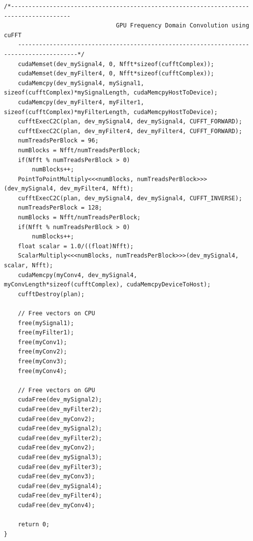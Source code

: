 \begin{lstlisting}[caption={CUDA code to performing complex convolution four different ways: time domain CPU, time domain GPU, time domain GPU using shared memory and frequency domain GPU.},label={code:convFun}]
	/*---------------------------------------------------------------------------------------
                                GPU Frequency Domain Convolution using cuFFT
	---------------------------------------------------------------------------------------*/
	cudaMemset(dev_mySignal4, 0, Nfft*sizeof(cufftComplex));
	cudaMemset(dev_myFilter4, 0, Nfft*sizeof(cufftComplex));
	cudaMemcpy(dev_mySignal4, mySignal1, sizeof(cufftComplex)*mySignalLength, cudaMemcpyHostToDevice);
	cudaMemcpy(dev_myFilter4, myFilter1, sizeof(cufftComplex)*myFilterLength, cudaMemcpyHostToDevice);
	cufftExecC2C(plan, dev_mySignal4, dev_mySignal4, CUFFT_FORWARD);
	cufftExecC2C(plan, dev_myFilter4, dev_myFilter4, CUFFT_FORWARD);
	numTreadsPerBlock = 96;
	numBlocks = Nfft/numTreadsPerBlock;
	if(Nfft % numTreadsPerBlock > 0)
		numBlocks++;
	PointToPointMultiply<<<numBlocks, numTreadsPerBlock>>>(dev_mySignal4, dev_myFilter4, Nfft);
	cufftExecC2C(plan, dev_mySignal4, dev_mySignal4, CUFFT_INVERSE);
	numTreadsPerBlock = 128;
	numBlocks = Nfft/numTreadsPerBlock;
	if(Nfft % numTreadsPerBlock > 0)
		numBlocks++;
	float scalar = 1.0/((float)Nfft);
	ScalarMultiply<<<numBlocks, numTreadsPerBlock>>>(dev_mySignal4, scalar, Nfft);
	cudaMemcpy(myConv4, dev_mySignal4, myConvLength*sizeof(cufftComplex), cudaMemcpyDeviceToHost);
	cufftDestroy(plan);

	// Free vectors on CPU
	free(mySignal1);
	free(myFilter1);
	free(myConv1);
	free(myConv2);
	free(myConv3);
	free(myConv4);

	// Free vectors on GPU
	cudaFree(dev_mySignal2);
	cudaFree(dev_myFilter2);
	cudaFree(dev_myConv2);
	cudaFree(dev_mySignal2);
	cudaFree(dev_myFilter2);
	cudaFree(dev_myConv2);
	cudaFree(dev_mySignal3);
	cudaFree(dev_myFilter3);
	cudaFree(dev_myConv3);
	cudaFree(dev_mySignal4);
	cudaFree(dev_myFilter4);
	cudaFree(dev_myConv4);

	return 0;
}
\end{lstlisting}
\doublespacing